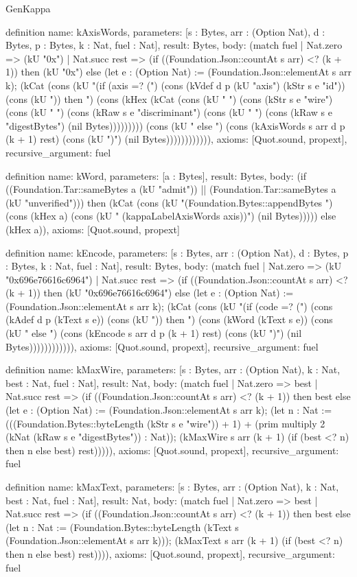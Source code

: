 \begin{lexlean}{GenKappa}
\begin{semanticmodule}
definition{
  name: kAxisWords,
  parameters: [s : Bytes, arr : (Option Nat), d : Bytes, p : Bytes, k : Nat, fuel : Nat],
  result: Bytes,
  body: (match fuel
    | Nat.zero => (kU "0x")
    | Nat.succ rest => (if ((Foundation.Json::countAt s arr) <? (k + 1)) then (kU "0x") else (let e : (Option Nat) := (Foundation.Json::elementAt s arr k); (kCat (cons (kU "(if (axis =? (") (cons (kVdef d p (kU "axis") (kStr s e "id")) (cons (kU ")) then ") (cons (kHex (kCat (cons (kU " ") (cons (kStr s e "wire") (cons (kU " ") (cons (kRaw s e "discriminant") (cons (kU " ") (cons (kRaw s e "digestBytes") (nil Bytes))))))))) (cons (kU " else ") (cons (kAxisWords s arr d p (k + 1) rest) (cons (kU ")") (nil Bytes)))))))))))),
  axioms: [Quot.sound, propext],
  recursive_argument: fuel
}

definition{
  name: kWord,
  parameters: [a : Bytes],
  result: Bytes,
  body: (if ((Foundation.Tar::sameBytes a (kU "admit")) || (Foundation.Tar::sameBytes a (kU "unverified"))) then (kCat (cons (kU "(Foundation.Bytes::appendBytes ") (cons (kHex a) (cons (kU " (kappaLabelAxisWords axis))") (nil Bytes))))) else (kHex a)),
  axioms: [Quot.sound, propext]
}

definition{
  name: kEncode,
  parameters: [s : Bytes, arr : (Option Nat), d : Bytes, p : Bytes, k : Nat, fuel : Nat],
  result: Bytes,
  body: (match fuel
    | Nat.zero => (kU "0x696e76616c6964")
    | Nat.succ rest => (if ((Foundation.Json::countAt s arr) <? (k + 1)) then (kU "0x696e76616c6964") else (let e : (Option Nat) := (Foundation.Json::elementAt s arr k); (kCat (cons (kU "(if (code =? (") (cons (kAdef d p (kText s e)) (cons (kU ")) then ") (cons (kWord (kText s e)) (cons (kU " else ") (cons (kEncode s arr d p (k + 1) rest) (cons (kU ")") (nil Bytes)))))))))))),
  axioms: [Quot.sound, propext],
  recursive_argument: fuel
}

definition{
  name: kMaxWire,
  parameters: [s : Bytes, arr : (Option Nat), k : Nat, best : Nat, fuel : Nat],
  result: Nat,
  body: (match fuel
    | Nat.zero => best
    | Nat.succ rest => (if ((Foundation.Json::countAt s arr) <? (k + 1)) then best else (let e : (Option Nat) := (Foundation.Json::elementAt s arr k); (let n : Nat := (((Foundation.Bytes::byteLength (kStr s e "wire")) + 1) + (prim multiply 2 (kNat (kRaw s e "digestBytes")) : Nat)); (kMaxWire s arr (k + 1) (if (best <? n) then n else best) rest))))),
  axioms: [Quot.sound, propext],
  recursive_argument: fuel
}

definition{
  name: kMaxText,
  parameters: [s : Bytes, arr : (Option Nat), k : Nat, best : Nat, fuel : Nat],
  result: Nat,
  body: (match fuel
    | Nat.zero => best
    | Nat.succ rest => (if ((Foundation.Json::countAt s arr) <? (k + 1)) then best else (let n : Nat := (Foundation.Bytes::byteLength (kText s (Foundation.Json::elementAt s arr k))); (kMaxText s arr (k + 1) (if (best <? n) then n else best) rest)))),
  axioms: [Quot.sound, propext],
  recursive_argument: fuel
}


\end{semanticmodule}
\end{lexlean}
